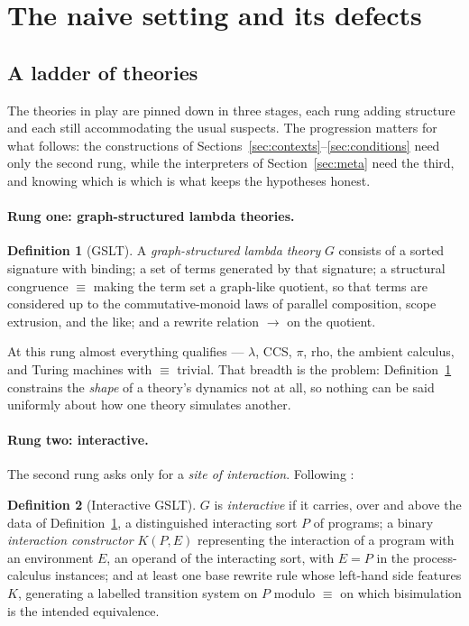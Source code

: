 \documentclass[11pt,a4paper]{article}
\theoremstyle{definition}
\newtheorem{definition}{Definition}[section]
\theoremstyle{plain}
\theoremstyle{remark}
\begin{document}
\section{The naive setting and its defects}
\label{sec:naive}

\subsection{A ladder of theories}

The theories in play are pinned down in three stages, each rung adding structure
and each still accommodating the usual suspects. The progression matters for what
follows: the constructions of Sections~\ref{sec:contexts}--\ref{sec:conditions}
need only the second rung, while the interpreters of Section~\ref{sec:meta} need
the third, and knowing which is which is what keeps the hypotheses honest.

\paragraph{Rung one: graph-structured lambda theories.}

\begin{definition}[GSLT]
\label{def:gslt}
A \emph{graph-structured lambda theory} $G$ consists of a sorted signature with
binding; a set of terms generated by that signature; a structural congruence
$\equiv$ making the term set a graph-like quotient, so that terms are considered up
to the commutative-monoid laws of parallel composition, scope extrusion, and the
like; and a rewrite relation $\to$ on the quotient.
\end{definition}

At this rung almost everything qualifies --- $\lambda$, CCS, $\pi$, rho, the ambient
calculus, and Turing machines with $\equiv$ trivial. That breadth is the problem:
Definition~\ref{def:gslt} constrains the \emph{shape} of a theory's dynamics not at
all, so nothing can be said uniformly about how one theory simulates another.

\paragraph{Rung two: interactive.}

The second rung asks only for a \emph{site of interaction}. Following
\cite[Def.~2.1]{cost}:

\begin{definition}[Interactive GSLT]
\label{def:igslt}
$G$ is \emph{interactive} if it carries, over and above the data of
Definition~\ref{def:gslt}, a distinguished interacting sort $P$ of programs; a binary
\emph{interaction constructor} $K(P,E)$ representing the interaction of a program with
an environment $E$, an operand of the interacting sort, with $E = P$ in the
process-calculus instances; and at least one base rewrite rule whose left-hand side
features $K$, generating a labelled transition system on $P$ modulo $\equiv$ on which
bisimulation is the intended equivalence.
\end{definition}
\end{document}
